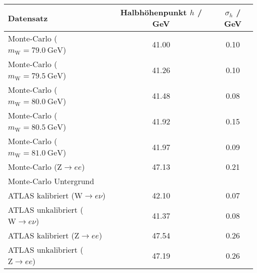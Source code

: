 \begin{tabular}{lSS}
\toprule
Datensatz 									      & {Halbhöhenpunkt $h$ / \si{GeV}} & {$\sigma_h$ / \si{GeV}} \\
\midrule
Monte-Carlo ($m_\mathrm{W}=\SI{79,0}{\GeV}$)      & 41.00 &         0.10 \\
Monte-Carlo ($m_\mathrm{W}=\SI{79,5}{\GeV}$)      & 41.26 &         0.10 \\
Monte-Carlo ($m_\mathrm{W}=\SI{80,0}{\GeV}$)      & 41.48 &         0.08 \\
Monte-Carlo ($m_\mathrm{W}=\SI{80,5}{\GeV}$)      & 41.92 &         0.15 \\
Monte-Carlo ($m_\mathrm{W}=\SI{81,0}{\GeV}$)      & 41.97 &         0.09 \\
Monte-Carlo ($\mathrm{Z}\rightarrow e e$)         & 47.13 &         0.21 \\
Monte-Carlo Untergrund                            &       &              \\
ATLAS kalibriert ($\mathrm{W}\rightarrow e\nu$)   & 42.10 &         0.07 \\
ATLAS unkalibriert ($\mathrm{W}\rightarrow e\nu$) & 41.37 &         0.08 \\
ATLAS kalibriert ($\mathrm{Z}\rightarrow e e$)    & 47.54 &         0.26 \\
ATLAS unkalibriert ($\mathrm{Z}\rightarrow e e$)  & 47.19 &         0.26 \\
\bottomrule
\end{tabular}
